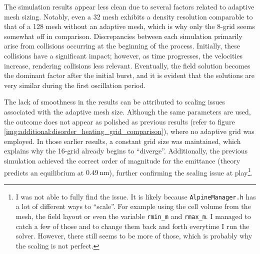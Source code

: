 The simulation results appear less clean due to several factors related to adaptive mesh sizing. Notably, even a 32 mesh exhibits a density resolution comparable to that of a 128 mesh without an adaptive mesh, which is why only the 8-grid seems somewhat off in comparison. Discrepancies between each simulation primarily arise from collisions occurring at the beginning of the process. Initially, these collisions have a significant impact; however, as time progresses, the velocities increase, rendering collisions less relevant. Eventually, the field solution becomes the dominant factor after the initial burst, and it is evident that the solutions are very similar during the first oscillation period. 

The lack of smoothness in the results can be attributed to scaling issues associated with the adaptive mesh size. Although the same parameters are used, the outcome does not appear as polished as previous results (refer to figure \ref{img:additional:disorder_heating_grid_comparison}), where no adaptive grid was employed. In those earlier results, a constant grid size was maintained, which explains why the 16-grid already begins to ``diverge''. Additionally, the previous simulation achieved the correct order of magnitude for the emittance (theory predicts an equilibrium at $0.49\,\si{\nano\metre}$), further confirming the scaling issue at play\footnote{I was not able to fully find the issue. It is likely because \texttt{AlpineManager.h} has a lot of different ways to ``scale''. For example using the cell volume from the mesh, the field layout or even the variable \texttt{rmin\_m} and \texttt{rmax\_m}. I managed to catch a few of those and to change them back and forth everytime I run the solver. However, there still seems to be more of those, which is probably why the scaling is not perfect.}.

